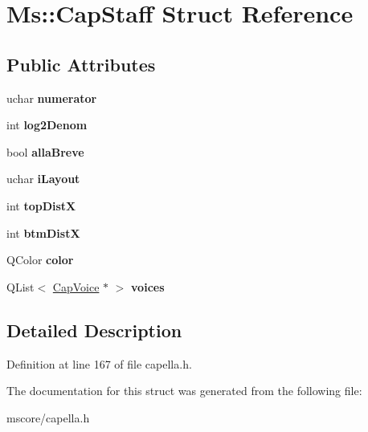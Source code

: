 \hypertarget{struct_ms_1_1_cap_staff}{}\section{Ms\+:\+:Cap\+Staff Struct Reference}
\label{struct_ms_1_1_cap_staff}
\subsection*{Public Attributes}
\begin{DoxyCompactItemize}
\item 
\mbox{\label{struct_ms_1_1_cap_staff_a7aef497605fa97fa04201e64ddb66962}} 
uchar {\bfseries numerator}
\item 
\mbox{\label{struct_ms_1_1_cap_staff_ac19e122024a9d9903929097cabc91ade}} 
int {\bfseries log2\+Denom}
\item 
\mbox{\label{struct_ms_1_1_cap_staff_ad9ea46e035301b92ac6c091bfbf1504c}} 
bool {\bfseries alla\+Breve}
\item 
\mbox{\label{struct_ms_1_1_cap_staff_a491f75eaccbbe046a810a62d04e65f64}} 
uchar {\bfseries i\+Layout}
\item 
\mbox{\label{struct_ms_1_1_cap_staff_a48bab357ff2137336a2d2833da37b2a5}} 
int {\bfseries top\+DistX}
\item 
\mbox{\label{struct_ms_1_1_cap_staff_a2850378b5500d7aa7d4704d5e22f8775}} 
int {\bfseries btm\+DistX}
\item 
\mbox{\label{struct_ms_1_1_cap_staff_af77aeaf51183d857e9ce77e7456ed490}} 
Q\+Color {\bfseries color}
\item 
\mbox{\label{struct_ms_1_1_cap_staff_a1236916e98d3cd1102cf756836a0535c}} 
Q\+List$<$ \hyperlink{struct_ms_1_1_cap_voice}{Cap\+Voice} $\ast$ $>$ {\bfseries voices}
\end{DoxyCompactItemize}


\subsection{Detailed Description}


Definition at line 167 of file capella.\+h.



The documentation for this struct was generated from the following file\+:\begin{DoxyCompactItemize}
\item 
mscore/capella.\+h\end{DoxyCompactItemize}
